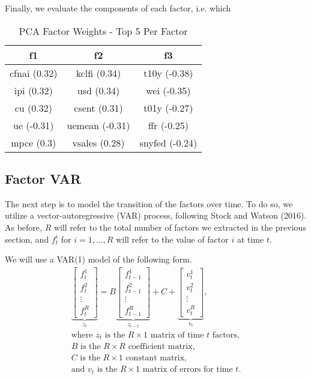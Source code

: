 \documentclass[11pt, letterpaper]{article}\usepackage[]{graphicx}\usepackage[]{color}
\begin{document}
Finally, we evaluate the components of each factor, i.e. which 
\begin{table}[H]
\centering
\begingroup\scriptsize
\begin{tabular}{ccc}
  \hline
f1 & f2 & f3 \\ 
  \hline
cfnai (0.32) & kclfi (0.34) & t10y (-0.38) \\ 
  ipi (0.32) & usd (0.34) & wei (-0.35) \\ 
  cu (0.32) & csent (0.31) & t01y (-0.27) \\ 
  ue (-0.31) & uemean (-0.31) & ffr (-0.25) \\ 
  mpce (0.3) & vsales (0.28) & snyfed (-0.24) \\ 
   \hline
\end{tabular}
\endgroup
\caption{PCA Factor Weights - Top 5 Per Factor} 
\end{table}




\subsection{Factor VAR}
The next step is to model the transition of the factors over time. To do so, we utilize a vector-autoregressive (VAR) process, following Stock and Watson (2016). As before, $R$ will refer to the total number of factors we extracted in the previous section, and $f^i_t$ for $i = 1, \dots, R$ will refer to the value of factor $i$ at time $t$.

We will use a VAR(1) model of the following form.
\begin{align*}
\underbrace{\begin{bmatrix}
	f^1_{t}\\
	f^2_{t}\\
	\vdots \\
	f^R_{t}
\end{bmatrix}}_{z_t}
=
B
\underbrace{\begin{bmatrix}
	f^1_{t-1}\\
	f^2_{t-1}\\
	\vdots \\
	f^R_{t-1}
\end{bmatrix}}_{z_{t-1}}
+
C
+
\underbrace{\begin{bmatrix}
v^1_t\\
v^2_t\\
\vdots\\
v^R_t
\end{bmatrix}}_{v_t},\\
\text{where $z_t$ is the $R \times 1$ matrix of time $t$ factors,}\\
\text{$B$ is the $R \times R$ coefficient matrix,}\\
\text{$C$ is the $R \times 1$ constant matrix,}\\
\text{and $v_t$ is the $R \times 1$ matrix of errors for time $t$.}
\end{align*}
\end{document}
